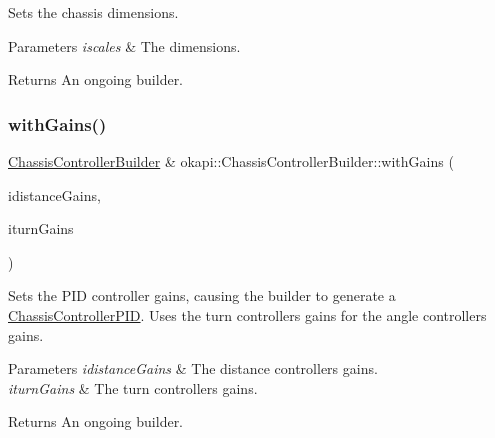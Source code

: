 Sets the chassis dimensions.


\begin{DoxyParams}{Parameters}
{\em iscales} & The dimensions. \\
\hline
\end{DoxyParams}
\begin{DoxyReturn}{Returns}
An ongoing builder. 
\end{DoxyReturn}
\mbox{\label{classokapi_1_1ChassisControllerBuilder_ac7b348a81cda8897540db92f14d1d8e3}} 
\subsubsection{\texorpdfstring{withGains()}{withGains()}\hspace{0.1cm}{\footnotesize\ttfamily [1/2]}}
{\footnotesize\ttfamily \mbox{\hyperlink{classokapi_1_1ChassisControllerBuilder}{Chassis\+Controller\+Builder}} \& okapi\+::\+Chassis\+Controller\+Builder\+::with\+Gains (\begin{DoxyParamCaption}\item[{const \mbox{\hyperlink{structokapi_1_1IterativePosPIDController_1_1Gains}{Iterative\+Pos\+P\+I\+D\+Controller\+::\+Gains}} \&}]{idistance\+Gains,  }\item[{const \mbox{\hyperlink{structokapi_1_1IterativePosPIDController_1_1Gains}{Iterative\+Pos\+P\+I\+D\+Controller\+::\+Gains}} \&}]{iturn\+Gains }\end{DoxyParamCaption})}

Sets the P\+ID controller gains, causing the builder to generate a \mbox{\hyperlink{classokapi_1_1ChassisControllerPID}{Chassis\+Controller\+P\+ID}}. Uses the turn controller\textquotesingle{}s gains for the angle controller\textquotesingle{}s gains.


\begin{DoxyParams}{Parameters}
{\em idistance\+Gains} & The distance controller\textquotesingle{}s gains. \\
\hline
{\em iturn\+Gains} & The turn controller\textquotesingle{}s gains. \\
\hline
\end{DoxyParams}
\begin{DoxyReturn}{Returns}
An ongoing builder. 
\end{DoxyReturn}
\mbox{\label{classokapi_1_1ChassisControllerBuilder_a4fa2d56589f5a4c8e69b36238bc3f4de}} 

